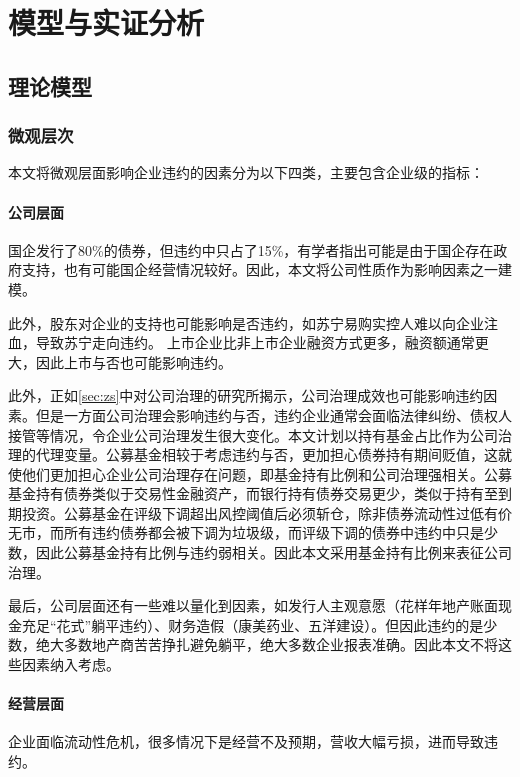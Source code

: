 
\chapter{模型与实证分析}

\section{理论模型}
\subsection{微观层次}
本文将微观层面影响企业违约的因素分为以下四类，主要包含企业级的指标：
\subsubsection{公司层面}

国企发行了80\%的债券，但违约中只占了15\%，有学者指出可能是由于国企存在政府支持\cite{mo2021china}，也有可能国企经营情况较好。因此，本文将公司性质作为影响因素之一建模。

此外，股东对企业的支持也可能影响是否违约，如苏宁易购实控人难以向企业注血，导致苏宁走向违约。
上市企业比非上市企业融资方式更多，融资额通常更大，因此上市与否也可能影响违约。

此外，正如\ref{sec:zs}中对公司治理的研究所揭示，公司治理成效也可能影响违约因素。但是一方面公司治理会影响违约与否，违约企业通常会面临法律纠纷、债权人接管等情况，令企业公司治理发生很大变化。本文计划以持有基金占比作为公司治理的代理变量。公募基金相较于考虑违约与否，更加担心债券持有期间贬值，这就使他们更加担心企业公司治理存在问题，即基金持有比例和公司治理强相关。公募基金持有债券类似于交易性金融资产，而银行持有债券交易更少，类似于持有至到期投资。公募基金在评级下调超出风控阈值后必须斩仓，除非债券流动性过低有价无市，而所有违约债券都会被下调为垃圾级，而评级下调的债券中违约中只是少数，因此公募基金持有比例与违约弱相关。因此本文采用基金持有比例来表征公司治理。

最后，公司层面还有一些难以量化到因素，如发行人主观意愿（花样年地产账面现金充足“花式”躺平违约）、财务造假（康美药业、五洋建设）。但因此违约的是少数，绝大多数地产商苦苦挣扎避免躺平，绝大多数企业报表准确。因此本文不将这些因素纳入考虑。
\subsubsection{经营层面}
企业面临流动性危机，很多情况下是经营不及预期，营收大幅亏损，进而导致违约。


